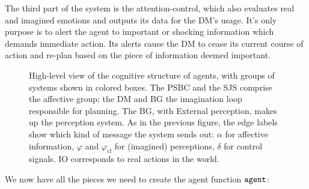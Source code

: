 The third part of the system is the attention-control, which also evaluates real and imagined emotions and outputs its data for the DM's usage. It's only purpose is to alert the agent to important or shocking information which demands immediate action. Its alerts cause the DM to cease its current course of action and re-plan based on the piece of information deemed important.

\begin{figure}
	\centering
	
	\caption{High-level view of the cognitive structure of agents, with groups of systems shown in colored boxes. The PSBC and the SJS comprise the affective group; the DM and BG the imagination loop responsible for planning. The BG, with External perception, makes up the perception system. As in the previous figure, the edge labels show which kind of message the system sends out: $\alpha$ for affective information, $\varphi$ and $\varphi_{\mathrm{cf}}$ for (imagined) perceptions, $\delta$ for control signals. IO corresponds to real actions in the world.}
	\label{fig:cognitive_system}
\end{figure}

We now have all the pieces we need to create the agent function $\mathtt{agent}$:

